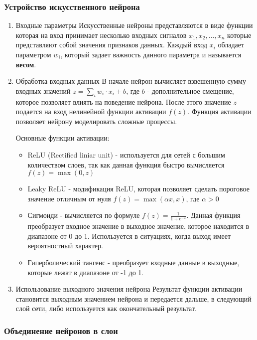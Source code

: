 \subsubsection{Устройство искусственного нейрона}
\begin{enumerate}
\item Входные параметры
Искусственные нейроны представляются в виде функции которая на вход принимает несколько входных
сигналов \(x_{1}, x_{2}, ..., x_{n}\) которые представляют собой значения признаков данных. Каждый
вход \(x_{i}\) обладает параметром \(w_{i}\), который задает важность данного параметра и называется
\textbf{весом}.

\item Обработка входных данных
В начале нейрон вычисляет взвешенную сумму входных значений \(z = \sum_{i} w_{i} \cdot x_{i} + b\),
где \(b\) - дополнительное смещение, которое позволяет влиять на поведение нейрона.
После этого значение \(z\) подается на вход нелинейной функции активации \(f(z)\). Функция активации
позволяет нейрону моделировать сложные процессы.

Основные функции активации:
\begin{itemize}
\item ReLU (Rectified liniar unit) - используется для сетей с большим количеством слоев, так как
данная функция быстро вычисляется \(f(z) = \max(0, z)\)
\item Leaky ReLU - модификация ReLU, которая позволяет сделать пороговое значение отличным от нуля
\(f(z) = \max(\alpha x,x)\), где \(\alpha>0\)
\item Сигмоиди - вычисляется по формуле \(f(z) = \frac{1}{1 + e^{-z}}\). Данная функция преобразует
входное значение в выходное значение, которое находится в диапазоне от 0 до 1. Используется в
ситуациях, когда выход имеет вероятностный характер.
\item Гиперболический тангенс - преобразует входные данные в выходные, которые лежат в диапазоне от
-1 до 1.
\end{itemize}

\item Использование выходного значения нейрона
Результат функции активации становится выходным значением нейрона и передается дальше, в
следующий слой сети, либо используется как окончательный результат.
\end{enumerate}
\subsubsection{Объединение нейронов в слои}

